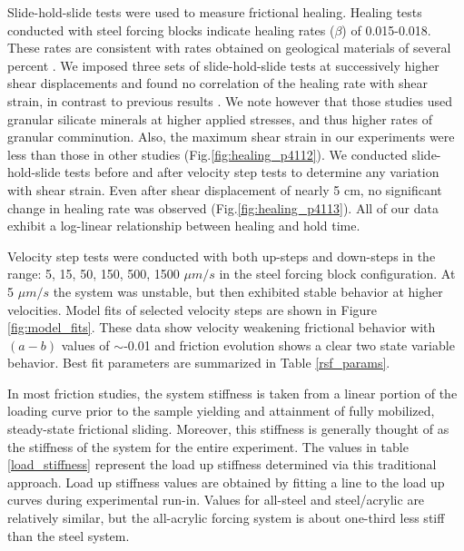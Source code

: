Slide-hold-slide tests were used to measure frictional healing. Healing tests
conducted with steel forcing blocks indicate healing rates ($\beta$) of
0.015-0.018.  These rates are consistent with rates obtained on geological
materials of several percent
\cite{dieterich1978time,dieterich1972time,marone1998laboratory,karner1997laboratory,beeler1994roles}.
We imposed three sets of slide-hold-slide tests at successively higher shear
displacements and found no correlation of the healing rate with shear strain, in
contrast to previous results \cite{Richardson_1999}.  We note however that those
studies used granular silicate minerals at higher applied stresses, and thus
higher rates of granular comminution.  Also, the maximum shear strain in our
experiments were less than those in other studies (Fig.\ref{fig:healing_p4112}).
We conducted slide-hold-slide tests before and after velocity step tests to
determine any variation with shear strain. Even after shear displacement of
nearly 5 cm, no significant change in healing rate was observed
(Fig.\ref{fig:healing_p4113}). All of our data exhibit a log-linear relationship
between healing and hold time.

Velocity step tests were conducted with both up-steps and down-steps in the
range: 5, 15, 50, 150, 500, 1500 $\mu m/s$ in the steel forcing block
configuration.  At 5  $\mu m/s$ the system was unstable, but then exhibited
stable behavior at higher velocities.  Model fits of selected velocity steps are
shown in Figure \ref{fig:model_fits}.  These data show velocity weakening
frictional behavior with $(a-b)$ values of $\sim$-0.01 and friction evolution
shows a clear two state variable behavior.  Best fit parameters are summarized
in Table \ref{rsf_params}.

In most friction studies, the system stiffness is taken from a linear portion of
the loading curve prior to the sample yielding and attainment of fully
mobilized, steady-state frictional sliding.  Moreover, this stiffness is
generally thought of as the stiffness of the system for the entire experiment.
The values in table \ref{load_stiffness} represent the load up stiffness
determined via this traditional approach.  Load up stiffness values are obtained
by fitting a line to the load up curves during experimental run-in.  Values for
all-steel and steel/acrylic are relatively similar, but the all-acrylic forcing
system is about one-third less stiff than the steel system.

